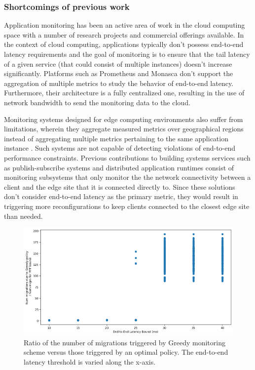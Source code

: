 \subsubsection{Shortcomings of previous work}
\par Application monitoring has been an active area of work in the cloud computing space with a number of research projects and commercial offerings available. In the context of cloud computing, applications typically don't possess end-to-end latency requirements and the goal of monitoring is to ensure that the tail latency of a given service (that could consist of multiple instances) doesn't increase significantly. Platforms such as Prometheus \cite{prometheus} and Monasca \cite{monasca} don't support the aggregation of multiple metrics to study the behavior of end-to-end latency. Furthermore, their architecture is a fully centralized one, resulting in the use of network bandwidth to send the monitoring data to the cloud.
\par Monitoring systems designed for edge computing environments also suffer from limitations, wherein they aggregate measured metrics over geographical regions instead of aggregating multiple metrics pertaining to the same application instance \cite{fmone, gonccalves2021dynamic}. Such systems are not capable of detecting violations of end-to-end performance constraints. Previous contributions to building systems services such as publish-subscribe systems \cite{emma} and distributed application runtimes \cite{foglets} consist of monitoring subsystems that only monitor the the network connectivity between a client and the edge site that it is connected directly to. Since these solutions don't consider end-to-end latency as the primary metric, they would result in triggering more reconfigurations to keep clients connected to the closest edge site than needed.
\begin{figure}
\centering
\includegraphics[width=0.75\linewidth]{figures/mechanisms/monitoring/migrations_count.png}
\caption{Ratio of the number of migrations triggered by Greedy monitoring scheme versus those triggered by an optimal policy. The end-to-end latency threshold is varied along the x-axis.}
\label{fig:migration_count}
\end{figure}
